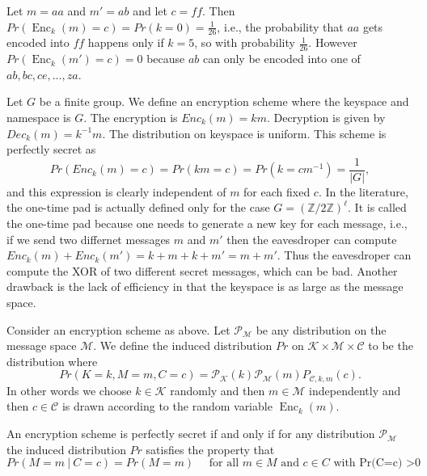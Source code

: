 \documentclass[twoside, a4paper, 10pt]{amsart}
\begin{document}
\begin{eg} Let $m = aa$ and $m' = ab$ and let $c = ff$. Then $Pr(\operatorname{Enc}_k(m) = c) = Pr( k = 0) = \frac{1}{26}$, i.e., the probability that $aa$ gets encoded into $ff$ happens only if $k = 5$, so with probability $\frac{1}{26}$. However $Pr(\operatorname{Enc}_k(m') = c) = 0$ because $ab$ can only be encoded into one of $ab, bc, ce, \ldots, za$.

\end{eg}

\begin{eg} Let $G$ be a finite group. We define an encryption scheme where the keyspace and namespace is $G$. The encryption is $Enc_k(m) = km$. Decryption is given by $Dec_k(m) = k^{-1}m$. The distribution on keyspace is uniform. This scheme is perfectly secret as $$Pr(Enc_k(m) = c) = Pr(km = c) = Pr(k = cm^{-1}) = \frac{1}{|G|},$$ and this expression is clearly independent of $m$ for each fixed $c$. In the literature, the one-time pad is actually defined only for the case $G = (\mathbb{Z}/2\mathbb{Z})^{\ell}$. It is called the one-time pad because one needs to generate a new key for each message, i.e., if we send two differnet messages $m$ and $m'$ then the eavesdroper can compute $Enc_k(m) + Enc_k(m') = k + m + k+ m' = m+m'$. Thus the eavesdroper can compute the XOR of two different secret messages, which can be bad. Another drawback is the lack of efficiency in that the keyspace is as large as the message space.

\end{eg}

\begin{mydef} Consider an encryption scheme as above. Let $\mathcal{P}_{\mathcal{M}}$ be any distribution on the message space $\mathcal{M}$. We define the induced distribution $Pr$ on $\mathcal{K} \times \mathcal{M} \times \mathcal{C}$ to be the distribution where $$Pr(K = k, M=m, C=c) = \mathcal{P}_{\mathcal{K}}(k) \mathcal{P}_{\mathcal{M}}(m) P_{\mathcal{C},k,m}(c).$$ In other words we choose $k \in \mathcal{K}$ randomly and then $m \in \mathcal{M}$ independently  and then $c \in \mathcal{C}$ is drawn according to the random variable $\operatorname{Enc}_k(m)$.

\end{mydef}

\begin{prop} An encryption scheme is perfectly secret if and only if for any distribution $\mathcal{P}_{\mathcal{M}}$ the induced distribution $Pr$ satisfies the property that $$Pr(M=m ~|~ C=c) = Pr(M = m) \quad \text{ for all } m \in M \text{ and } c \in C \text{ with Pr(C=c) >0} $$

\end{prop}
\end{document}
